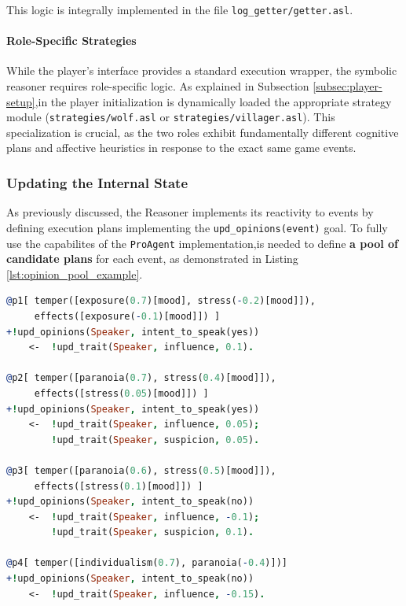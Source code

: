 This logic is integrally implemented in the file \texttt{log\_getter/getter.asl}.

\paragraph{Role-Specific Strategies}
While the player's interface provides a standard execution wrapper, the symbolic reasoner requires role-specific logic. As explained in Subsection \ref{subsec:player-setup},in the player initialization is dynamically loaded the appropriate strategy module (\texttt{strategies/wolf.asl} or \texttt{strategies/villager.asl}). This specialization is crucial, as the two roles exhibit fundamentally different cognitive plans and affective heuristics in response to the exact same game events.


\subsubsection{Updating the Internal State}
As previously discussed, the Reasoner implements its reactivity to events by defining execution plans implementing the \texttt{upd\_opinions(event)} goal. To fully use the capabilites of the \texttt{ProAgent} implementation,is needed to define \textbf{a pool of candidate plans} for each event, as demonstrated in Listing \ref{lst:opinion_pool_example}.

\begin{lstlisting}[frame=single, language=Prolog, caption={Example of the Villager's plan pool used to react to a player's intent to speak. The java engine selects the most suitable reaction based on the agent's temper.}, label={lst:opinion_pool_example}]
@p1[ temper([exposure(0.7)[mood], stress(-0.2)[mood]]), 
     effects([exposure(-0.1)[mood]]) ]
+!upd_opinions(Speaker, intent_to_speak(yes))
    <-  !upd_trait(Speaker, influence, 0.1).

@p2[ temper([paranoia(0.7), stress(0.4)[mood]]),
     effects([stress(0.05)[mood]]) ]
+!upd_opinions(Speaker, intent_to_speak(yes))
    <-  !upd_trait(Speaker, influence, 0.05);
        !upd_trait(Speaker, suspicion, 0.05).

@p3[ temper([paranoia(0.6), stress(0.5)[mood]]), 
     effects([stress(0.1)[mood]]) ]
+!upd_opinions(Speaker, intent_to_speak(no))
    <-  !upd_trait(Speaker, influence, -0.1);
        !upd_trait(Speaker, suspicion, 0.1).

@p4[ temper([individualism(0.7), paranoia(-0.4)])]
+!upd_opinions(Speaker, intent_to_speak(no))
    <-  !upd_trait(Speaker, influence, -0.15).
\end{lstlisting}

